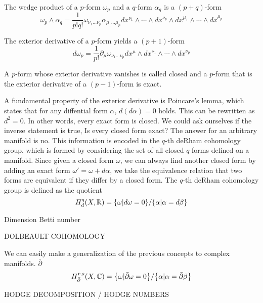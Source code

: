 The wedge product of a $p$-form $\omega_p$ and a $q$-form $\alpha_q$ is a $(p+q)$-form
\begin{equation}
  \omega_p \wedge \alpha_q  = \frac{1}{p!q!}\omega_{\nu_1\ldots\nu_p}
\alpha_{\mu_1\ldots\mu_p}dx^{\nu_1}\wedge \cdots  \wedge dx^{\nu_p}\wedge dx^{\mu_1}\wedge \cdots  \wedge dx^{\mu_p} 
\end{equation}

The exterior derivative of a $p$-form yields a $(p+1)$-form
\begin{equation}
  d\omega_p = \frac{1}{p!}\partial_\mu \omega_{\nu_1\ldots\nu_p}dx^\mu\wedge dx^{\nu_1}\wedge\cdots\wedge dx^{\nu_p}
\end{equation}

A $p$-form whose exterior derivative vanishes is called closed and a $p$-form that is the exterior derivative
of a $(p-1)$-form is exact.

A fundamental property of the exterior derivative is Poincare's lemma, which states that for any diffential form $\alpha$, $d(d\alpha)=0$ holds.
This can be rewritten as $d^2=0$. In other words, every exact form is closed.
We could ask ourselves if the inverse statement is true, 
Is every closed form exact?
The answer for an arbitrary manifold is no.%
This information is encoded in the $q$-th deRham cohomology group, which is formed by considering
the set of all closed $q$-forms defined on a manifold.
Since given a closed form $\omega$, we can always find another closed form by adding an exact form
$\omega' = \omega+d\alpha$, we take the equivalence relation that two forms are equivalent if
they differ by a closed form.
The $q$-th deRham cohomology group is defined as the quotient
\begin{equation}
  H^q_d(X,\mathbb R)=\qty{\omega| d\omega=0}/\qty{\alpha|\alpha=d\beta}
\end{equation}

Dimension Betti number

DOLBEAULT COHOMOLOGY

We can easily make a generalization of the previous concepts to complex manifolds.
$\bar\partial$
\begin{equation}
  H^{r,s}_{\bar \partial }(X,\mathbb C)=\qty {\omega | \bar \partial \omega= 0}/\qty{\alpha|\alpha=\bar\partial \beta}
\end{equation}

HODGE DECOMPOSITION / HODGE NUMBERS


